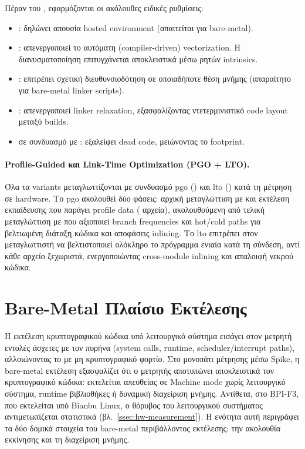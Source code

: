Πέραν του , εφαρμόζονται οι ακόλουθες ειδικές ρυθμίσεις:

\begin{itemize}
  \item {}: δηλώνει απουσία hosted environment (απαιτείται
    για bare-metal).
  \item {}: απενεργοποιεί το αυτόματη (compiler-driven)
    vectorization. Η διανυσματοποίηση επιτυγχάνεται αποκλειστικά
    μέσω ρητών intrinsics.
  \item {}: επιτρέπει σχετική διευθυνσιοδότηση σε
    οποιαδήποτε θέση μνήμης (απαραίτητο για bare-metal linker scripts).
  \item {}: απενεργοποιεί linker relaxation, εξασφαλίζοντας
    ντετερμινιστικό code layout μεταξύ builds.
  \item {} σε συνδυασμό με
    : εξαλείφει dead code, μειώνοντας το 
    footprint.
\end{itemize}

\paragraph{Profile-Guided και Link-Time Optimization (PGO + LTO).}
\label{ssec:lto-pgo}

Όλα τα variants μεταγλωττίζονται με συνδυασμό \gls{pgo} ()
και \gls{lto} () κατά τη μέτρηση σε hardware. Το \gls{pgo}
ακολουθεί δύο φάσεις: αρχική μεταγλώττιση με  και
εκτέλεση εκπαίδευσης που παράγει profile data (
αρχεία), ακολουθούμενη από τελική μεταγλώττιση με  που
αξιοποιεί branch frequencies και hot/cold paths για βελτιωμένη διάταξη κώδικα και
αποφάσεις inlining. Το \gls{lto} επιτρέπει στον μεταγλωττιστή να βελτιστοποιεί
ολόκληρο το πρόγραμμα ενιαία κατά τη σύνδεση, αντί κάθε αρχείο ξεχωριστά,
ενεργοποιώντας cross-module inlining και απαλοιφή νεκρού κώδικα.

\section{Bare-Metal Πλαίσιο Εκτέλεσης}
\label{sec:bare-metal}

Η εκτέλεση κρυπτογραφικού κώδικα υπό λειτουργικό σύστημα εισάγει στον μετρητή
εντολές άσχετες με τον πυρήνα (system calls, runtime, scheduler/interrupt paths),
αλλοιώνοντας το \instret με μη κρυπτογραφικό φορτίο. Στο μονοπάτι μέτρησης μέσω
Spike, η bare-metal εκτέλεση εξασφαλίζει ότι ο μετρητής αποτυπώνει αποκλειστικά
τον κρυπτογραφικό κώδικα: εκτελείται απευθείας σε Machine mode χωρίς λειτουργικό
σύστημα, runtime βιβλιοθήκες ή δυναμική διαχείριση μνήμης. Αντίθετα, στο BPI-F3,
που εκτελείται υπό Bianbu Linux, ο θόρυβος του λειτουργικού συστήματος
αντιμετωπίζεται στατιστικά (βλ.\ \cref{ssec:hw-measurement}). Η ενότητα αυτή περιγράφει τα δύο δομικά στοιχεία του bare-metal
περιβάλλοντος εκτέλεσης: την ακολουθία εκκίνησης και τη διαχείριση μνήμης.

